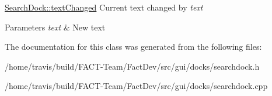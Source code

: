 \hyperlink{classGui_1_1Docks_1_1SearchDock_a9b33dea8adfe26b4d7a5dadffbbb07a7}{Search\-Dock\-::text\-Changed} Current text changed by {\itshape text} 


\begin{DoxyParams}{Parameters}
{\em text} & New text \\
\hline
\end{DoxyParams}


The documentation for this class was generated from the following files\-:\begin{DoxyCompactItemize}
\item 
/home/travis/build/\-F\-A\-C\-T-\/\-Team/\-Fact\-Dev/src/gui/docks/searchdock.\-h\item 
/home/travis/build/\-F\-A\-C\-T-\/\-Team/\-Fact\-Dev/src/gui/docks/searchdock.\-cpp\end{DoxyCompactItemize}
